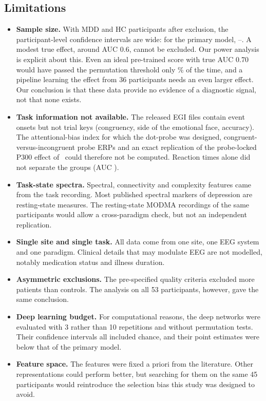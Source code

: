\subsection{Limitations}
\begin{itemize}
  \item \textbf{Sample size.} With \NIncludedMDD{} MDD and \NIncludedHC{} HC participants after exclusion, the
        participant-level confidence intervals are wide: for the primary model,
        \PrimaryLrLAllAucLo--\PrimaryLrLAllAucHi. A modest true effect, around AUC 0.6, cannot be excluded. Our power analysis is
        explicit about this. Even an ideal pre-trained score with true AUC 0.70 would have passed the permutation
        threshold only \AudPowIdealSeventy\% of the time, and a pipeline learning the effect from 36 participants
        needs an even larger effect. Our conclusion is that these data provide no evidence of a diagnostic signal,
        not that none exists.
  \item \textbf{Task information not available.} The released EGI files contain event onsets but not trial keys
        (congruency, side of the emotional face, accuracy). The attentional-bias index for which the dot-probe was
        designed, congruent-versus-incongruent probe ERPs and an exact replication of the probe-locked P300 effect
        of~\cite{li2018attentional} could therefore not be computed. Reaction times alone did not separate the groups
        (AUC \AudBehaviourRTLRAuc).
  \item \textbf{Task-state spectra.} Spectral, connectivity and complexity features came from the task recording.
        Most published spectral markers of depression are resting-state measures. The resting-state MODMA recordings
        of the same participants would allow a cross-paradigm check, but not an independent replication.
  \item \textbf{Single site and single task.} All data come from one site, one EEG system and one paradigm. Clinical
        details that may modulate EEG are not modelled, notably medication status and illness duration.
  \item \textbf{Asymmetric exclusions.} The pre-specified quality criteria excluded more patients than controls. The
        analysis on all 53 participants, however, gave the same conclusion.
  \item \textbf{Deep learning budget.} For computational reasons, the deep networks were evaluated with 3 rather than
        10 repetitions and without permutation tests. Their confidence intervals all included chance, and their point
        estimates were below that of the primary model.
  \item \textbf{Feature space.} The features were fixed a priori from the literature. Other representations could
        perform better, but searching for them on the same 45 participants would reintroduce the selection bias this
        study was designed to avoid.
\end{itemize}

